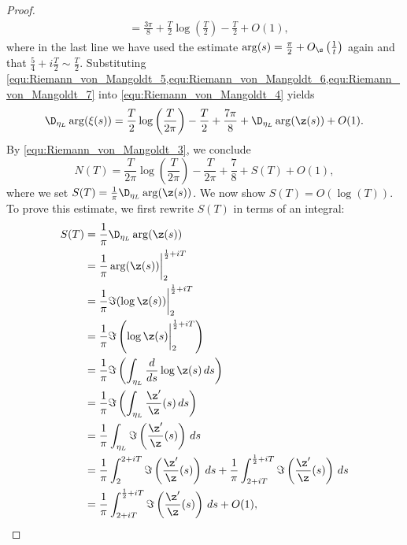 \begin{proof}
\begin{equation}
\begin{aligned}
            &= \frac{3\pi}{8}+\frac{T}{2}\log\left(\frac{T}{2}\right)-\frac{T}{2}+O(1),
          \end{aligned}
        \end{equation}
        where in the last line we have used the estimate $\arg(s) = \frac{\pi}{2}+O_{\s}\left(\frac{1}{t}\right)$ again and that $\frac{5}{4}+i\frac{T}{2} \sim \frac{T}{2}$. Substituting \cref{equ:Riemann_von_Mangoldt_5,equ:Riemann_von_Mangoldt_6,equ:Riemann_von_Mangoldt_7} into \cref{equ:Riemann_von_Mangoldt_4} yields
        \[
          \D_{\eta_{L}}\arg(\xi(s)) = \frac{T}{2}\log\left(\frac{T}{2\pi}\right)-\frac{T}{2}+\frac{7\pi}{8}+\D_{\eta_{L}}\arg(\z(s))+O(1).
        \]
        By \cref{equ:Riemann_von_Mangoldt_3}, we conclude
        \begin{equation}\label{equ:Riemann_von_Mangoldt_8}
          N(T) = \frac{T}{2\pi}\log\left(\frac{T}{2\pi}\right)-\frac{T}{2\pi}+\frac{7}{8}+S(T)+O(1),
        \end{equation}
        where we set $S(T) = \frac{1}{\pi}\D_{\eta_{L}}\arg(\z(s))$. We now show $S(T) = O(\log(T))$. To prove this estimate, we first rewrite $S(T)$ in terms of an integral:
        \begin{equation}\label{equ:Riemann_von_Mangoldt_9}
          \begin{aligned}
            S(T) &= \frac{1}{\pi}\D_{\eta_{L}}\arg(\z(s)) \\
            &= \frac{1}{\pi}\arg(\z(s))\bigg|_{2}^{\frac{1}{2}+iT} \\
            &= \frac{1}{\pi}\Im(\log\z(s))\bigg|_{2}^{\frac{1}{2}+iT} \\
            &= \frac{1}{\pi}\Im\left(\log\z(s)\bigg|_{2}^{\frac{1}{2}+iT}\right) \\
            &= \frac{1}{\pi}\Im\left(\int_{\eta_{L}}\frac{d}{ds}\log\z(s)\,ds\right) \\
            &= \frac{1}{\pi}\Im\left(\int_{\eta_{L}}\frac{\z'}{\z}(s)\,ds\right) \\
            &= \frac{1}{\pi}\int_{\eta_{L}}\Im\left(\frac{\z'}{\z}(s)\right)\,ds \\
            &= \frac{1}{\pi}\int_{2}^{2+iT}\Im\left(\frac{\z'}{\z}(s)\right)\,ds+\frac{1}{\pi}\int_{2+iT}^{\frac{1}{2}+iT}\Im\left(\frac{\z'}{\z}(s)\right)\,ds \\
            &= \frac{1}{\pi}\int_{2+iT}^{\frac{1}{2}+iT}\Im\left(\frac{\z'}{\z}(s)\right)\,ds+O(1),
          \end{aligned}
        \end{equation}

\end{proof}
